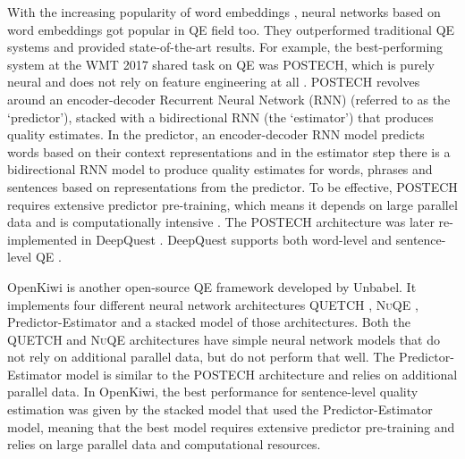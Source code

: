 With the increasing popularity of word embeddings \autocite{DBLP:journals/corr/abs-1301-3781}, neural networks based on word embeddings got popular in QE field too. They outperformed traditional QE systems and provided state-of-the-art results. For example, the best-performing system at the WMT 2017 shared task on QE was \textsc{POSTECH}, which is purely neural and does not rely on feature engineering at all \autocite{kim-etal-2017-predictor}. \textsc{POSTECH} revolves around an encoder-decoder Recurrent Neural Network (RNN) (referred to as the `predictor'), stacked with a bidirectional RNN (the `estimator') that produces quality estimates. In the predictor, an encoder-decoder RNN model predicts words based on their context representations and in the estimator step there is a bidirectional RNN model to produce quality estimates for words, phrases and sentences based on representations from the predictor. To be effective, \textsc{POSTECH} requires extensive predictor pre-training, which means it depends on large parallel data and is computationally intensive \autocite{ive-etal-2018-deepquest}. The \textsc{POSTECH} architecture was later re-implemented in DeepQuest  \autocite{ive-etal-2018-deepquest}. DeepQuest supports both word-level and sentence-level QE \autocite{ive-etal-2018-deepquest}. 

OpenKiwi \autocite{kepler-etal-2019-openkiwi} is another open-source QE framework developed by Unbabel. It implements four different neural network architectures \textsc{QUETCH} \autocite{kreutzer-etal-2015-quality}, \textsc{NuQE} \autocite{martins-etal-2016-unbabels}, Predictor-Estimator \autocite{kim-etal-2017-predictor} and a stacked model of those architectures. Both the \textsc{QUETCH} and \textsc{NuQE} architectures have simple neural network models that do not rely on additional parallel data, but do not perform that well. The Predictor-Estimator model is similar to the \textsc{POSTECH} architecture and relies on additional parallel data. In OpenKiwi, the best performance for sentence-level quality estimation was given by the stacked model that used the Predictor-Estimator model, meaning that the best model requires extensive predictor pre-training and relies on large parallel data and computational resources. 

